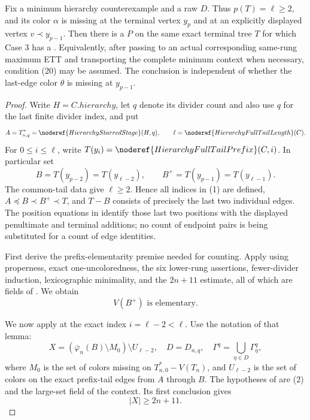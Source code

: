 \begin{lemma}
Fix a minimum hierarchy counterexample and a raw
 \(D\).  Thus
\(p(T)=\ell\ge2\), and its color \(\alpha\) is missing at the terminal
vertex \(y_p\) and at an explicitly displayed vertex
\(v\prec y_{p-1}\).  Then there is a
 \(P\) on the same exact
terminal tree \(T\) for which Case 3 has a
.  Equivalently,
after passing to an actual corresponding same-rung maximum ETT and
transporting the complete minimum context when necessary, condition (20)
may be assumed.  The conclusion is independent of whether the last-edge
color \(\theta\) is missing at \(y_{p-1}\).
\end{lemma}
\begin{proof}
Write \(H=C.\mathit{hierarchy}\), let \(q\) denote its divider count and
also use \(q\) for the last finite divider index, and put
\[
 A=T_{n,q}^{*}=\noderef{HierarchyStarredStage}(H,q),\qquad
 \ell=\noderef{HierarchyFullTailLength}(C).
\]
For \(0\le i\le\ell\), write
\(T(y_i)=\noderef{HierarchyFullTailPrefix}(C,i)\).  In particular set
\[
 B=T(y_{p-2})=T(y_{\ell-2}),
 \qquad B^+=T(y_{p-1})=T(y_{\ell-1}).                           \tag{1}
\]
The common-tail data give \(\ell\ge2\).  Hence all indices in (1) are
defined, \(A\preccurlyeq B\prec B^+\prec T\), and \(T-B\) consists of
precisely the last two individual edges.  The position equations in
 identify those last two
positions with the displayed penultimate and terminal additions; no count
of endpoint pairs is being substituted for a count of edge identities.

First derive the prefix-elementarity premise needed for counting.  Apply
 using properness,
exact one-uncoloredness, the six lower-rung assertions, fewer-divider
induction, lexicographic minimality, and the \(2n+11\) estimate, all of
which are fields of
.  We obtain
\[
                       V(B^+)\text{ is elementary}.            \tag{2}
\]

We now apply  at the exact index \(i=\ell-2<\ell\).
Use the notation of that lemma:
\[
 X=(\overline\varphi_n(B)\setminus M_0)\setminus U_{\ell-2},
 \quad D=D_{n,q},\quad
 \Gamma^q=\bigcup_{\eta\in D}\Gamma^q_\eta,                  \tag{3}
\]
where \(M_0\) is the set of colors missing on
\(T_{n,0}^{*}-V(T_n)\), and \(U_{\ell-2}\) is the set of colors on the
exact prefix-tail edges from \(A\) through \(B\).  The hypotheses of
 are (2) and the large-set field of the context.  Its first
conclusion gives
\[
                         |X|\ge2n+11.                           \tag{4}
\]


\end{proof}

